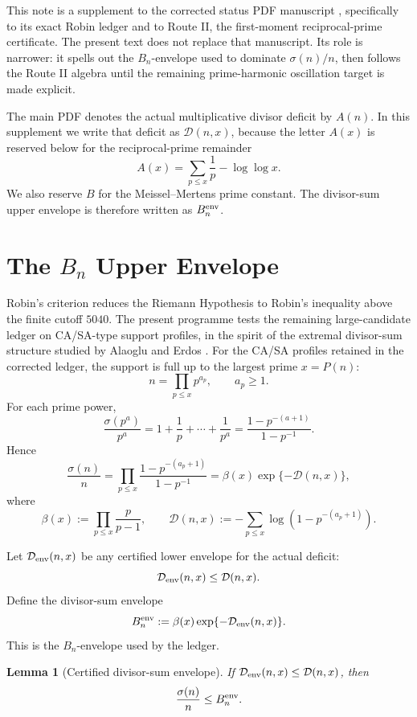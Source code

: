 \documentclass[11pt,a4paper]{article}
\newtheorem{lemma}{Lemma}
\begin{document}
This note is a supplement to the corrected status PDF manuscript
\cite{polakcorrected2026}, specifically to its exact Robin ledger and to
Route II, the first-moment reciprocal-prime certificate.
The present text does not replace that manuscript. Its role is narrower: it
spells out the \(B_n\)-envelope used to dominate \(\sigma(n)/n\), then follows
the Route II algebra until the remaining prime-harmonic oscillation target is
made explicit.

The main PDF denotes the actual multiplicative divisor deficit by \(A(n)\).
In this supplement we write that deficit as \(\mathcal D(n,x)\), because the
letter \(A(x)\) is reserved below for the reciprocal-prime remainder
\[
  A(x)=\sum_{p\le x}\frac1p-\log\log x.
\]
We also reserve \(B\) for the Meissel--Mertens prime constant. The divisor-sum
upper envelope is therefore written as \(B_n^{\rm env}\).

\section{The \(B_n\) Upper Envelope}

Robin's criterion \cite{robin1984} reduces the Riemann Hypothesis to Robin's
inequality above the finite cutoff \(5040\).  The present programme tests the
remaining large-candidate ledger on CA/SA-type support profiles, in the spirit
of the extremal divisor-sum structure studied by Alaoglu and Erdos
\cite{alaogluerdos1944}. For the CA/SA profiles retained in the corrected
ledger, the support is full up to the largest prime \(x=P(n)\):
\[
  n=\prod_{p\le x}p^{a_p},\qquad a_p\ge1.
\]
For each prime power,
\[
  \frac{\sigma(p^a)}{p^a}
  =
  1+\frac1p+\cdots+\frac1{p^a}
  =
  \frac{1-p^{-(a+1)}}{1-p^{-1}}.
\]
Hence
\[
  \frac{\sigma(n)}{n}
  =
  \prod_{p\le x}
  \frac{1-p^{-(a_p+1)}}{1-p^{-1}}
  =
  \beta(x)\exp\{-\mathcal D(n,x)\},
\]
where
\[
  \beta(x):=\prod_{p\le x}\frac{p}{p-1},
  \qquad
  \mathcal D(n,x):=
  -\sum_{p\le x}\log\left(1-p^{-(a_p+1)}\right).
\]

Let \(\mathcal D_{\rm env}(n,x)\) be any certified lower envelope for the
actual deficit:
\[
  \mathcal D_{\rm env}(n,x)\le \mathcal D(n,x).
\]
Define the divisor-sum envelope
\begin{equation}\label{eq:bn-env}
  B_n^{\rm env}:=
  \beta(x)\exp\{-\mathcal D_{\rm env}(n,x)\}.
\end{equation}
This is the \(B_n\)-envelope used by the ledger.

\begin{lemma}[Certified divisor-sum envelope]\label{lem:bn-envelope}
If \(\mathcal D_{\rm env}(n,x)\le \mathcal D(n,x)\), then
\[
  \frac{\sigma(n)}{n}\le B_n^{\rm env}.
\]
\end{lemma}
\end{document}
